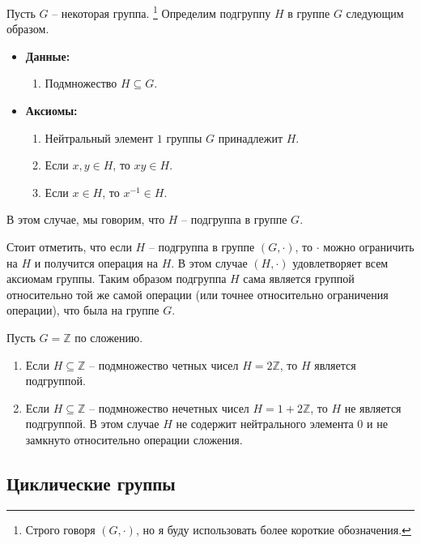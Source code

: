 \begin{definition}
Пусть $G$ -- некоторая группа.%
\footnote{Строго говоря $(G,\cdot)$, но я буду использовать более короткие обозначения.}
Определим подгруппу $H$ в группе $G$ следующим образом.
\begin{itemize}
\item \textbf{Данные:} 
\begin{enumerate}
\item Подмножество $H\subseteq G$.
\end{enumerate}
\item \textbf{Аксиомы:}
\begin{enumerate}
\item Нейтральный элемент $1$ группы $G$ принадлежит $H$.

\item Если $x,y\in H$, то $x  y\in H$.

\item Если $x\in H$, то $x^{-1}\in H$.
\end{enumerate}
\end{itemize}
В этом случае, мы говорим, что $H$ -- подгруппа в группе $G$.
\end{definition}

Стоит отметить, что если $H$ -- подгруппа в группе $(G,\cdot)$, то $\cdot$ можно ограничить на $H$ и получится операция на $H$.
В этом случае $(H, \cdot)$ удовлетворяет всем аксиомам группы.
Таким образом подгруппа $H$ сама является группой относительно той же самой операции (или точнее относительно ограничения операции), что была на группе $G$.

\begin{examples}
Пусть $G =\mathbb Z$ по сложению.
\begin{enumerate}
\item Если $H\subseteq \mathbb Z$ -- подмножество четных чисел $H = 2\mathbb Z$, то $H$ является подгруппой.

\item Если $H\subseteq \mathbb Z$ -- подмножество нечетных чисел $H = 1 + 2 \mathbb Z$, то $H$ не является подгруппой.
В этом случае $H$ не содержит нейтрального элемента $0$ и не замкнуто относительно операции сложения.
\end{enumerate}
\end{examples}

\subsection{Циклические группы}

